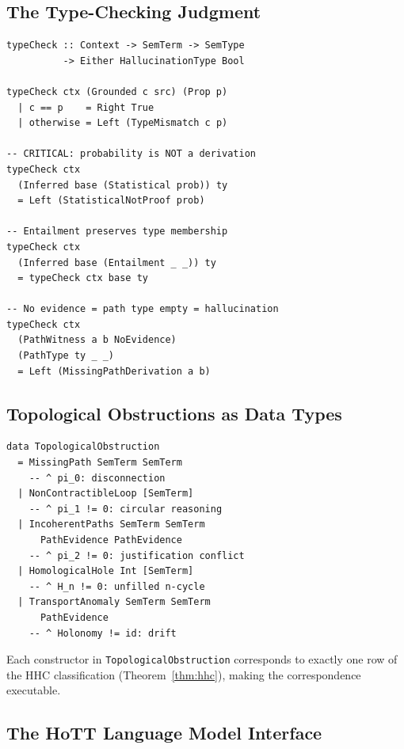 \documentclass[11pt,a4paper]{article}
\theoremstyle{plain}
\theoremstyle{definition}
\begin{document}
\subsection{The Type-Checking Judgment}

\begin{lstlisting}[caption={Type checking replaces token prediction}]
typeCheck :: Context -> SemTerm -> SemType
          -> Either HallucinationType Bool

typeCheck ctx (Grounded c src) (Prop p)
  | c == p    = Right True
  | otherwise = Left (TypeMismatch c p)

-- CRITICAL: probability is NOT a derivation
typeCheck ctx
  (Inferred base (Statistical prob)) ty
  = Left (StatisticalNotProof prob)

-- Entailment preserves type membership
typeCheck ctx
  (Inferred base (Entailment _ _)) ty
  = typeCheck ctx base ty

-- No evidence = path type empty = hallucination
typeCheck ctx
  (PathWitness a b NoEvidence)
  (PathType ty _ _)
  = Left (MissingPathDerivation a b)
\end{lstlisting}

\subsection{Topological Obstructions as Data Types}

\begin{lstlisting}[caption={Hallucination types classified by topology}]
data TopologicalObstruction
  = MissingPath SemTerm SemTerm
    -- ^ pi_0: disconnection
  | NonContractibleLoop [SemTerm]
    -- ^ pi_1 != 0: circular reasoning
  | IncoherentPaths SemTerm SemTerm
      PathEvidence PathEvidence
    -- ^ pi_2 != 0: justification conflict
  | HomologicalHole Int [SemTerm]
    -- ^ H_n != 0: unfilled n-cycle
  | TransportAnomaly SemTerm SemTerm
      PathEvidence
    -- ^ Holonomy != id: drift
\end{lstlisting}

Each constructor in \texttt{TopologicalObstruction} corresponds to exactly one row of the HHC classification (Theorem~\ref{thm:hhc}), making the correspondence executable.

\subsection{The HoTT Language Model Interface}
\end{document}
